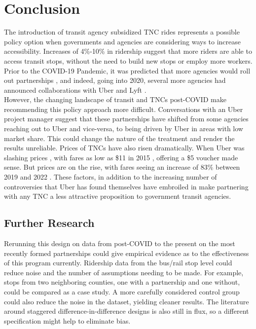 \documentclass [12pt]{report}
\begin{document}
\section*{Conclusion}
The introduction of transit agency subsidized TNC rides represents a possible policy option when governments and agencies are considering ways to increase accessibility. Increases of 4\%-10\% in ridership suggest that more riders are able to access transit stops, without the need to build new stops or employ more workers. Prior to the COVID-19 Pandemic, it was predicted that more agencies would roll out partnerships \parencite{depaul}, and indeed, going into 2020, several more agencies had announced collaborations with Uber and Lyft \parencite{atpapartner}. \\
\indent However, the changing landscape of transit and TNCs post-COVID make recommending this policy approach more difficult. Conversations with an Uber project manager suggest that these partnerships have shifted from some agencies reaching out to Uber and vice-versa, to being driven by Uber in areas with low market share. This could change the nature of the treatment and render the results unreliable. Prices of TNCs have also risen dramatically. When Uber was slashing prices , with fares as low as \$11 in 2015 \parencite{vox}, offering a \$5 voucher made sense. But prices are on the rise, with fares seeing an increase of 83\% between 2019 and 2022 \parencite{sherman}. These factors, in addition to the increasing number of controversies that Uber has found themselves have embroiled in \parencite{guardian} make partnering with any TNC a less attractive proposition to government transit agencies.

\subsection*{Further Research}
Rerunning this design on data from post-COVID to the present on the most recently formed partnerships could give empirical evidence as to the effectiveness of this program currently. Ridership data from the bus/rail stop level could reduce noise and the number of assumptions needing to be made. For example, stops from two neighboring counties, one with a partnership and one without, could be compared as a case study. A more carefully considered control group could also reduce the noise in the dataset, yielding cleaner results. The literature around staggered difference-in-difference designs is also still in flux, so a different specification might help to eliminate bias.

\newpage
{}
\printbibliography
\end{document}
